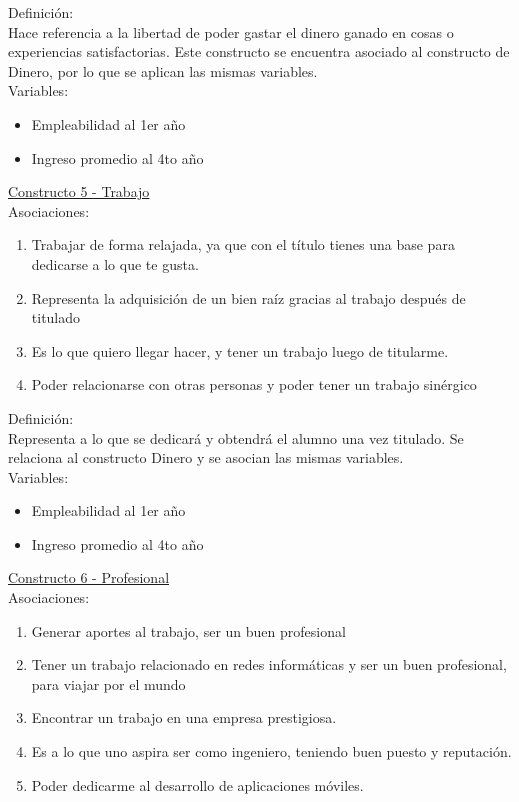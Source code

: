 Definición:\\
Hace referencia a la libertad de poder gastar el dinero ganado en cosas o experiencias satisfactorias. Este constructo se encuentra asociado al constructo de Dinero, por lo que se aplican las mismas variables.\\

Variables:
\begin{itemize}
	\item Empleabilidad al 1er año
	\item Ingreso promedio al 4to año	
\end{itemize}


\underline {Constructo 5 - Trabajo} \\
Asociaciones:
\begin{enumerate}
	\item Trabajar de forma relajada, ya que con el título tienes una base para dedicarse a lo que te gusta.
	\item Representa la adquisición de un bien raíz gracias al trabajo después de titulado
	\item Es lo que quiero llegar hacer, y tener un trabajo luego de titularme.	
	\item Poder relacionarse con otras personas y poder tener un trabajo sinérgico
\end{enumerate}

Definición:\\
Representa a lo que se dedicará y obtendrá el alumno una vez titulado. Se relaciona al constructo Dinero y se asocian las mismas variables.\\

Variables:
\begin{itemize}
	\item Empleabilidad al 1er año
	\item Ingreso promedio al 4to año	
\end{itemize}


\underline {Constructo 6 - Profesional} \\
Asociaciones:
\begin{enumerate}
	\item Generar aportes al trabajo, ser un buen profesional
	\item Tener un trabajo relacionado en redes informáticas y ser un buen profesional, para viajar por el mundo
	\item Encontrar un trabajo en una empresa prestigiosa.	
	\item Es a lo que uno aspira ser como ingeniero, teniendo buen puesto y reputación.
	\item Poder dedicarme al desarrollo de aplicaciones móviles.
\end{enumerate}

